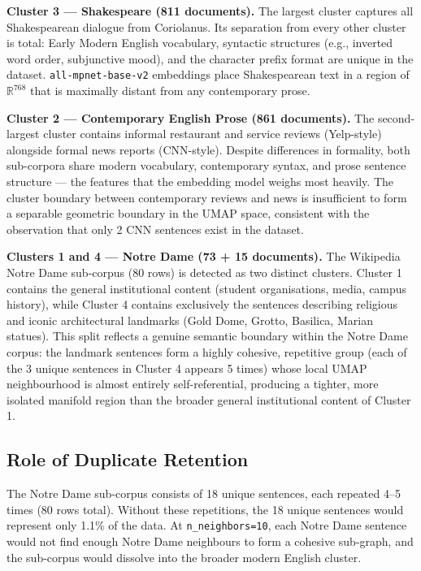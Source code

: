\documentclass[11pt, a4paper]{article}
\begin{document}
\textbf{Cluster 3 --- Shakespeare (811 documents).}  The largest cluster
captures all Shakespearean dialogue from Coriolanus.  Its separation from
every other cluster is total: Early Modern English vocabulary, syntactic
structures (e.g., inverted word order, subjunctive mood), and the character
prefix format are unique in the dataset.  \texttt{all-mpnet-base-v2}
embeddings place Shakespearean text in a region of $\mathbb{R}^{768}$ that is
maximally distant from any contemporary prose.

\textbf{Cluster 2 --- Contemporary English Prose (861 documents).}  The
second-largest cluster contains informal restaurant and service reviews
(Yelp-style) alongside formal news reports (CNN-style).  Despite differences
in formality, both sub-corpora share modern vocabulary, contemporary syntax,
and prose sentence structure --- the features that the embedding model weighs
most heavily.  The cluster boundary between contemporary reviews and news is
insufficient to form a separable geometric boundary in the UMAP space,
consistent with the observation that only 2 CNN sentences exist in the dataset.

\textbf{Clusters 1 and 4 --- Notre Dame (73 + 15 documents).}  The Wikipedia
Notre Dame sub-corpus (80 rows) is detected as two distinct clusters.  Cluster
1 contains the general institutional content (student organisations, media,
campus history), while Cluster 4 contains exclusively the sentences describing
religious and iconic architectural landmarks (Gold Dome, Grotto, Basilica,
Marian statues).  This split reflects a genuine semantic boundary within the
Notre Dame corpus: the landmark sentences form a highly cohesive, repetitive
group (each of the 3 unique sentences in Cluster 4 appears 5 times) whose
local UMAP neighbourhood is almost entirely self-referential, producing a
tighter, more isolated manifold region than the broader general institutional
content of Cluster 1.

\subsection{Role of Duplicate Retention}

The Notre Dame sub-corpus consists of 18 unique sentences, each repeated 4--5
times (80 rows total).  Without these repetitions, the 18 unique sentences
would represent only 1.1\% of the data.  At \texttt{n\_neighbors=10}, each
Notre Dame sentence would not find enough Notre Dame neighbours to form a
cohesive sub-graph, and the sub-corpus would dissolve into the broader modern
English cluster.
\end{document}
